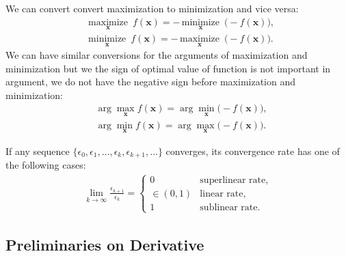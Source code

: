 \documentclass[lang=cn,10pt]{gorgeousnbook}
\numberwithin{equation}{section}%
\numberwithin{figure}{section}%
\begin{document}
\begin{remark}
We can convert convert maximization to minimization and vice versa: 
\begin{equation}\label{equation_max_min_conversion}
\begin{aligned}
& \underset{\boldsymbol{x}}{\text{maximize}}\,\,\, f(\boldsymbol{x}) = -\,\underset{\boldsymbol{x}}{\text{minimize}}\,\,\, \big(\!\!-\!f(\boldsymbol{x})\big), \\
& \underset{\boldsymbol{x}}{\text{minimize}}\,\,\, f(\boldsymbol{x}) = -\,\underset{\boldsymbol{x}}{\text{maximize}}\,\,\, \big(\!\!-\!f(\boldsymbol{x})\big).
\end{aligned}
\end{equation}
We can have similar conversions for the arguments of maximization and minimization but we the sign of optimal value of function is not important in argument, we do not have the negative sign before maximization and minimization:
\begin{equation}
\begin{aligned}
& \arg\max_{\boldsymbol{x}} f(\boldsymbol{x}) = \arg\min_{\boldsymbol{x}} \big(\!\!-\!f(\boldsymbol{x})\big), \\
& \arg\min_{\boldsymbol{x}} f(\boldsymbol{x}) = \arg\max_{\boldsymbol{x}} \big(\!\!-\!f(\boldsymbol{x})\big).
\end{aligned}
\end{equation}
\end{remark}

\begin{definition}\label{definition_convergence_rate}
If any sequence $\{\epsilon_0, \epsilon_1, \dots, \epsilon_{k}, \epsilon_{k+1}, \dots\}$ converges, its convergence rate has one of the following cases:
\begin{align}
\lim_{k \rightarrow \infty} \frac{\epsilon_{k+1}}{\epsilon_k} = 
\left\{
    \begin{array}{ll}
        0 & \mbox{superlinear rate}, \\
        \in (0,1) & \mbox{linear rate}, \\
        1 & \mbox{sublinear rate}.
    \end{array}
\right.
\end{align}
\end{definition}

\subsection{Preliminaries on Derivative}
\end{document}
